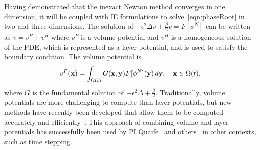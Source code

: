 Having demonstrated that the inexact Newton method converges in one
dimension, it will be coupled with IE formulations to
solve~\eqref{eqn:phaseRoot} in two and three dimensions. The solution of
$-\epsilon^2 \Delta v + \tfrac{\beta}{2} v = F[\phi^N]$ can be written
as $v = v^P + v^H$ where $v^P$ is a volume potential and $v^H$ is a
homogeneous solution of the PDE, which is represented as a layer
potential, and is used to satisfy the boundary condition. The volume
potential is
\begin{align*}
  v^{P}(\mathbf{x}) = \int_{\Omega(t)} G(\mathbf{x},\mathbf{y}) F[\phi^N](\mathbf{y})\, d\mathbf{y}, 
    \quad \mathbf{x} \in \Omega(t),
\end{align*}
where $G$ is the fundamental solution of $-\epsilon^2 \Delta +
\tfrac{\beta}{2}$. Traditionally, volume potentials are more challenging
to compute than layer potentials, but new methods have recently been
developed that allow them to be computed accurately and
efficiently~\cite{fry-leh-tor2018, and-zhu-vee2022}. This approach of
combining volume and layer potentials has successfully been used by PI
Quaife~\cite{kro-qua2010} and others~\cite{fry-kro-tor2019,
kli-ask-kro2020, che-hua-lei2005} in other contexts, such as time
stepping.


